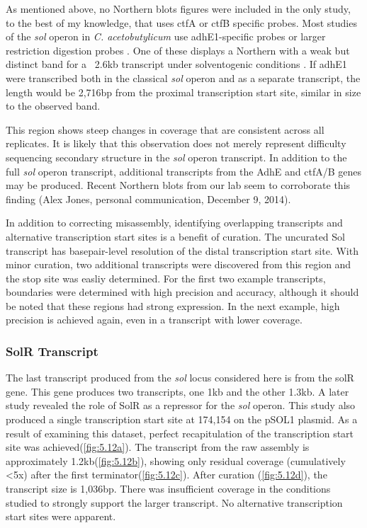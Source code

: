 As mentioned above, no Northern blots figures were included in the only study, to the best of my knowledge, that uses ctfA or ctfB specific probes\cite{65}. Most studies of the \textit{sol} operon in \textit{C. acetobutylicum} use adhE1-specific probes or larger restriction digestion probes \cite{63,68,71}. One of these displays a Northern with a weak but distinct band for a ~2.6kb transcript under solventogenic conditions \cite{69}. If adhE1 were transcribed both in the classical \textit{sol} operon and as a separate transcript, the length would be 2,716bp from the proximal transcription start site, similar in size to the observed band\cite{69}. 

This region shows steep changes in coverage that are consistent across all replicates. It is likely that this observation does not merely represent difficulty sequencing secondary structure in the \textit{sol} operon transcript. In addition to the full \textit{sol} operon transcript, additional transcripts from the AdhE and ctfA/B genes may be produced. Recent Northern blots from our lab seem to corroborate this finding (Alex Jones, personal communication, December 9, 2014).

In addition to correcting misassembly, identifying overlapping transcripts and alternative transcription start sites is a benefit of curation. The uncurated Sol transcript has basepair-level resolution of the distal transcription start site. With minor curation, two additional transcripts were discovered from this region and the stop site was easliy determined. For the first two example transcripts, boundaries were determined with high precision and accuracy, although it should be noted that these regions had strong expression. In the next example, high precision is achieved again, even in a transcript with lower coverage.


\subsubsection{SolR Transcript}
The last transcript produced from the \textit{sol} locus considered here is from the solR gene. This gene produces two transcripts, one 1kb and the other 1.3kb\cite{63}. A later study revealed the role of SolR as a repressor for the \textit{sol} operon\cite{69}. This study also produced a single transcription start site at 174,154 on the pSOL1 plasmid. As a result of examining this dataset, perfect recapitulation of the transcription start site was achieved(\ref{fig:5.12a}). The transcript from the raw assembly is approximately 1.2kb(\ref{fig:5.12b}), showing only residual coverage (cumulatively \textless 5x) after the first terminator(\ref{fig:5.12c}). After curation (\ref{fig:5.12d}), the transcript size is 1,036bp. There was insufficient coverage in the conditions studied to strongly support the larger transcript. No alternative transcription start sites were apparent.

